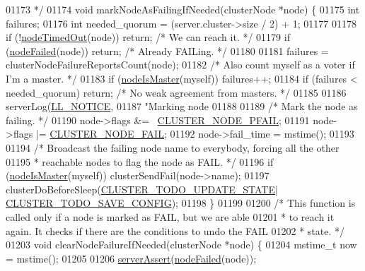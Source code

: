 \begin{DoxyCode}
{{{{{{{{{{{{{{{01173 \textcolor{comment}{ */}
01174 \textcolor{keywordtype}{void} markNodeAsFailingIfNeeded(clusterNode *node) \{
01175     \textcolor{keywordtype}{int} failures;
01176     \textcolor{keywordtype}{int} needed\_quorum = (server.cluster->size / 2) + 1;
01177 
01178     \textcolor{keywordflow}{if} (!\hyperlink{cluster_8h_ac0ab1cbdbc2a49b30c98d73640476e32}{nodeTimedOut}(node)) \textcolor{keywordflow}{return}; \textcolor{comment}{/* We can reach it. */}
01179     \textcolor{keywordflow}{if} (\hyperlink{cluster_8h_a6a31c614ff4f5ac8ebaa630b0a921c3d}{nodeFailed}(node)) \textcolor{keywordflow}{return}; \textcolor{comment}{/* Already FAILing. */}
01180 
01181     failures = clusterNodeFailureReportsCount(node);
01182     \textcolor{comment}{/* Also count myself as a voter if I'm a master. */}
01183     \textcolor{keywordflow}{if} (\hyperlink{cluster_8h_a2d8e84269474d8750565fb3fb67aa436}{nodeIsMaster}(myself)) failures++;
01184     \textcolor{keywordflow}{if} (failures < needed\_quorum) \textcolor{keywordflow}{return}; \textcolor{comment}{/* No weak agreement from masters. */}
01185 
01186     serverLog(\hyperlink{server_8h_a8c54c191e436c7dd3012167212692401}{LL\_NOTICE},
01187         \textcolor{stringliteral}{"Marking node %
01188 
01189     \textcolor{comment}{/* Mark the node as failing. */}
01190     node->flags &= ~\hyperlink{cluster_8h_a5306c1ae8988b8be0a1a02bd9162dfa1}{CLUSTER\_NODE\_PFAIL};
01191     node->flags |= \hyperlink{cluster_8h_ad211e85c7baf8a5a59acd747e4e9005a}{CLUSTER\_NODE\_FAIL};
01192     node->fail\_time = mstime();
01193 
01194     \textcolor{comment}{/* Broadcast the failing node name to everybody, forcing all the other}
01195 \textcolor{comment}{     * reachable nodes to flag the node as FAIL. */}
01196     \textcolor{keywordflow}{if} (\hyperlink{cluster_8h_a2d8e84269474d8750565fb3fb67aa436}{nodeIsMaster}(myself)) clusterSendFail(node->name);
01197     clusterDoBeforeSleep(\hyperlink{cluster_8h_abea0d393cba342261e4a7e6fb745f388}{CLUSTER\_TODO\_UPDATE\_STATE}|
      \hyperlink{cluster_8h_a0ae5ff08fbae3c655012b4de8bfc327d}{CLUSTER\_TODO\_SAVE\_CONFIG});
01198 \}
01199 
01200 \textcolor{comment}{/* This function is called only if a node is marked as FAIL, but we are able}
01201 \textcolor{comment}{ * to reach it again. It checks if there are the conditions to undo the FAIL}
01202 \textcolor{comment}{ * state. */}
01203 \textcolor{keywordtype}{void} clearNodeFailureIfNeeded(clusterNode *node) \{
01204     mstime\_t now = mstime();
01205 
01206     \hyperlink{server_8h_a88114b5169b4c382df6b56506285e56a}{serverAssert}(\hyperlink{cluster_8h_a6a31c614ff4f5ac8ebaa630b0a921c3d}{nodeFailed}(node));
}}}}}}}}}}}}}}}}
\end{DoxyCode}
